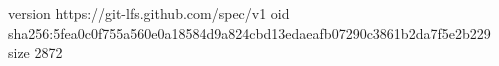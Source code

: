 version https://git-lfs.github.com/spec/v1
oid sha256:5fea0c0f755a560e0a18584d9a824cbd13edaeafb07290c3861b2da7f5e2b229
size 2872
